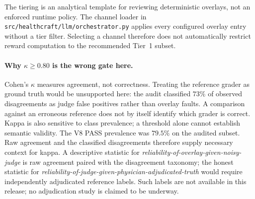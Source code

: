 The tiering is an analytical template for reviewing deterministic
overlays, not an enforced runtime policy. The channel loader in
\texttt{src/healthcraft/llm/orchestrator.py} applies every configured
overlay entry without a tier filter. Selecting a channel therefore does
not automatically restrict reward computation to the recommended
Tier~1 subset.

\paragraph{Why $\kappa \ge 0.80$ is the wrong gate here.}
Cohen's $\kappa$ measures agreement, not correctness. Treating the
reference grader as ground truth would be unsupported here: the audit
classified $73\%$ of observed disagreements %
as judge false positives rather than overlay faults. A
comparison against an erroneous reference does not by itself identify
which grader is correct. Kappa is also sensitive to class prevalence;
a threshold alone cannot establish semantic validity. The V8 PASS
prevalence was
$79.5\%$ %
on the audited subset. Raw agreement and the classified disagreements
therefore supply necessary context for kappa. A descriptive statistic for
\emph{reliability-of-overlay-given-noisy-judge} is raw
agreement paired with the disagreement taxonomy; the
honest statistic for
\emph{reliability-of-judge-given-physician-adjudicated-truth}
would require independently adjudicated reference labels. Such labels
are not available in this release; no adjudication study is claimed to be underway.

